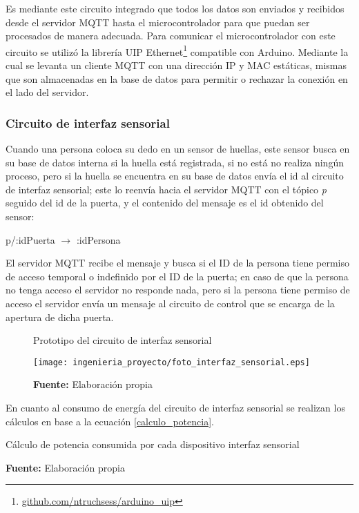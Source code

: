 \documentclass[../principal]{subfiles}
\begin{document}
  Es mediante este circuito integrado que todos los datos son enviados y recibidos desde el servidor MQTT hasta el microcontrolador para que puedan ser procesados de manera adecuada. Para comunicar el microcontrolador con este circuito se utilizó la librería UIP Ethernet\footnote{\href{https://github.com/ntruchsess/arduino_uip}{github.com/ntruchsess/arduino\_uip}} compatible con Arduino. Mediante la cual se levanta un cliente MQTT con una dirección IP y MAC estáticas, mismas que son almacenadas en la base de datos para permitir o rechazar la conexión en el lado del servidor.

  \subsubsection*{Circuito de interfaz sensorial}

  Cuando una persona coloca su dedo en un sensor de huellas, este sensor busca en su base de datos interna si la huella está registrada, si no está no realiza ningún proceso, pero si la huella se encuentra en su base de datos envía el id al circuito de interfaz sensorial; este lo reenvía hacia el servidor MQTT con el tópico \textit{p} seguido del id de la puerta, y el contenido del mensaje es el id obtenido del sensor:

  \begin{center}
    p/:idPuerta \quad $ \rightarrow $ \quad :idPersona
  \end{center}

  El servidor MQTT recibe el mensaje y busca si el ID de la persona tiene permiso de acceso temporal o indefinido por el ID de la puerta; en caso de que la persona no tenga acceso el servidor no responde nada, pero si la persona tiene permiso de acceso el servidor envía un mensaje al circuito de control que se encarga de la apertura de dicha puerta.

  \begin{figure}[h]
    \centering
    \caption{Prototipo del circuito de interfaz sensorial}
    \texttt{[image: ingenieria\_proyecto/foto\_interfaz\_sensorial.eps]}
    \caption*{\textbf{Fuente:} Elaboración propia}
  \end{figure}

  En cuanto al consumo de energía del circuito de interfaz sensorial se realizan los cálculos en base a la ecuación \ref{calculo_potencia}.

  \begin{table}[H]
    \centering
    \caption{Cálculo de potencia consumida por cada dispositivo interfaz sensorial}
    
    \caption*{\textbf{Fuente:} Elaboración propia}
  \end{table}
\end{document}
